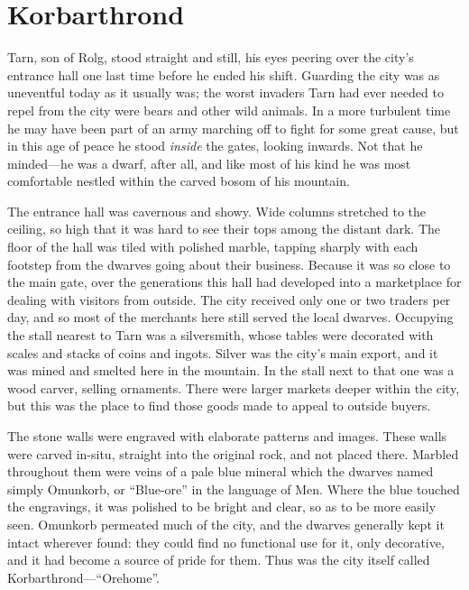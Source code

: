 \chapter{Korbarthrond}
Tarn, son of Rolg, stood straight and still, his eyes peering over the city's entrance hall one last time before he ended his shift.  Guarding the city was as uneventful today as it usually was; the worst invaders Tarn had ever needed to repel from the city were bears and other wild animals.  In a more turbulent time he may have been part of an army marching off to fight for some great cause, but in this age of peace he stood \emph{inside} the gates, looking inwards.  Not that he minded---he was a dwarf, after all, and like most of his kind he was most comfortable nestled within the carved bosom of his mountain.

The entrance hall was cavernous and showy.  Wide columns stretched to the ceiling, so high that it was hard to see their tops among the distant dark.  The floor of the hall was tiled with polished marble, tapping sharply with each footstep from the dwarves going about their business.  Because it was so close to the main gate, over the generations this hall had developed into a marketplace for dealing with visitors from outside.  The city received only one or two traders per day, and so most of the merchants here still served the local dwarves.  Occupying the stall nearest to Tarn was a silversmith, whose tables were decorated with scales and stacks of coins and ingots.  Silver was the city's main export, and it was mined and smelted here in the mountain.  In the stall next to that one was a wood carver, selling ornaments.  There were larger markets deeper within the city, but this was the place to find those goods made to appeal to outside buyers.

The stone walls were engraved with elaborate patterns and images.  These walls were carved in-situ, straight into the original rock, and not placed there.  Marbled throughout them were veins of a pale blue mineral which the dwarves named simply Omunkorb, or ``Blue-ore'' in the language of Men.  Where the blue touched the engravings, it was polished to be bright and clear, so as to be more easily seen.  Omunkorb permeated much of the city, and the dwarves generally kept it intact wherever found: they could find no functional use for it, only decorative, and it had become a source of pride for them.  Thus was the city itself called Korbarthrond---``Orehome''.

